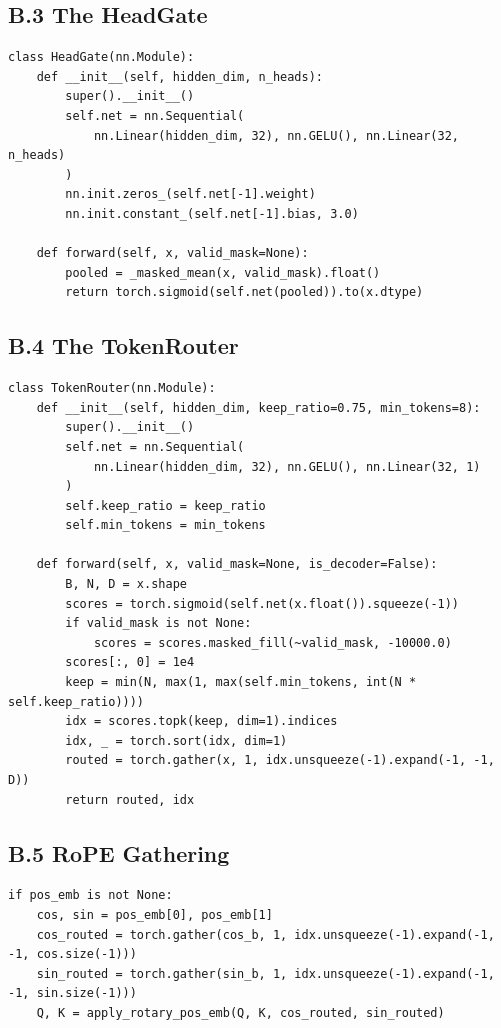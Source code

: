 \subsection{B.3 The HeadGate}

\begin{lstlisting}
class HeadGate(nn.Module):
    def __init__(self, hidden_dim, n_heads):
        super().__init__()
        self.net = nn.Sequential(
            nn.Linear(hidden_dim, 32), nn.GELU(), nn.Linear(32, n_heads)
        )
        nn.init.zeros_(self.net[-1].weight)
        nn.init.constant_(self.net[-1].bias, 3.0)
    
    def forward(self, x, valid_mask=None):
        pooled = _masked_mean(x, valid_mask).float()
        return torch.sigmoid(self.net(pooled)).to(x.dtype)
\end{lstlisting}

\subsection{B.4 The TokenRouter}

\begin{lstlisting}
class TokenRouter(nn.Module):
    def __init__(self, hidden_dim, keep_ratio=0.75, min_tokens=8):
        super().__init__()
        self.net = nn.Sequential(
            nn.Linear(hidden_dim, 32), nn.GELU(), nn.Linear(32, 1)
        )
        self.keep_ratio = keep_ratio
        self.min_tokens = min_tokens
    
    def forward(self, x, valid_mask=None, is_decoder=False):
        B, N, D = x.shape
        scores = torch.sigmoid(self.net(x.float()).squeeze(-1))
        if valid_mask is not None:
            scores = scores.masked_fill(~valid_mask, -10000.0)
        scores[:, 0] = 1e4
        keep = min(N, max(1, max(self.min_tokens, int(N * self.keep_ratio))))
        idx = scores.topk(keep, dim=1).indices
        idx, _ = torch.sort(idx, dim=1)
        routed = torch.gather(x, 1, idx.unsqueeze(-1).expand(-1, -1, D))
        return routed, idx
\end{lstlisting}

\subsection{B.5 RoPE Gathering}

\begin{lstlisting}
if pos_emb is not None:
    cos, sin = pos_emb[0], pos_emb[1]
    cos_routed = torch.gather(cos_b, 1, idx.unsqueeze(-1).expand(-1, -1, cos.size(-1)))
    sin_routed = torch.gather(sin_b, 1, idx.unsqueeze(-1).expand(-1, -1, sin.size(-1)))
    Q, K = apply_rotary_pos_emb(Q, K, cos_routed, sin_routed)
\end{lstlisting}

